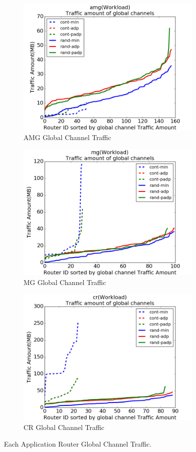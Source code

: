 \documentclass[conference,compsoc]{IEEEtran}
\begin{document}
\begin{figure}[t!]
    \centering
    \begin{subfigure}[t]{0.32\textwidth}
        \centering
        \includegraphics[height=1.8 in]{amg/gc-traffic}
        \caption{AMG Global Channel Traffic}
        \label{fig:amg-gc-traffic}
    \end{subfigure}%
    \hspace{1em}%
    \begin{subfigure}[t]{0.32\textwidth}
        \centering
        \includegraphics[height=1.8 in]{mg/gc-traffic}
        \caption{MG Global Channel Traffic}
        \label{fig:mg-gc-traffic}
    \end{subfigure}%
    \begin{subfigure}[t]{0.32\textwidth}
        \centering
        \includegraphics[height=1.8 in]{cr/gc-traffic}
        \caption{CR Global Channel Traffic}
        \label{fig:cr-gc-traffic}
    \end{subfigure}%
   \caption{Each Application Router Global Channel Traffic.}
   \label{fig:3app-gl-traffic}
\end{figure}
\end{document}
